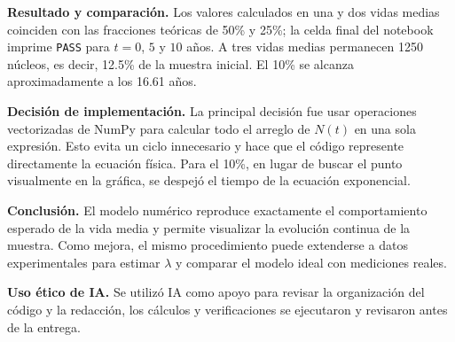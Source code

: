 \documentclass[10pt]{article}
\begin{document}
\textbf{Resultado y comparación.}
Los valores calculados en una y dos vidas medias coinciden con las fracciones teóricas de 50\% y 25\%; la celda final del notebook imprime \texttt{PASS} para $t=0$, $5$ y $10$ años. A tres vidas medias permanecen 1250 núcleos, es decir, 12.5\% de la muestra inicial. El 10\% se alcanza aproximadamente a los 16.61 años.

\textbf{Decisión de implementación.}
La principal decisión fue usar operaciones vectorizadas de NumPy para calcular todo el arreglo de $N(t)$ en una sola expresión. Esto evita un ciclo innecesario y hace que el código represente directamente la ecuación física. Para el 10\%, en lugar de buscar el punto visualmente en la gráfica, se despejó el tiempo de la ecuación exponencial.

\textbf{Conclusión.}
El modelo numérico reproduce exactamente el comportamiento esperado de la vida media y permite visualizar la evolución continua de la muestra. Como mejora, el mismo procedimiento puede extenderse a datos experimentales para estimar $\lambda$ y comparar el modelo ideal con mediciones reales.

\textbf{Uso ético de IA.}
Se utilizó IA como apoyo para revisar la organización del código y la redacción, los cálculos y verificaciones se ejecutaron y revisaron antes de la entrega.
\end{document}
